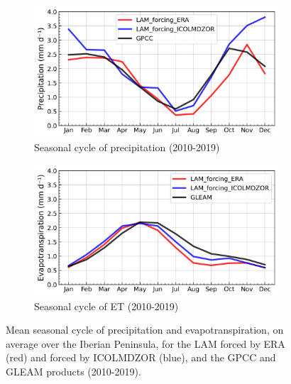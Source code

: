 \begin{figure}[htbp]
    \centering
    \begin{subfigure}[b]{0.49\textwidth}
        \caption{Seasonal cycle of precipitation (2010-2019)}
        \includegraphics[width=\textwidth]{images/chap4/forcing_source/IP_seasonal_cycle_precip.png}
    \end{subfigure}
    \begin{subfigure}[b]{0.49\textwidth}
        \caption{Seasonal cycle of ET (2010-2019)}
        \includegraphics[width=\textwidth]{images/chap4/forcing_source/IP_seasonal_cycle_evap.png}
    \end{subfigure}
    \caption{Mean seasonal cycle of precipitation and evapotranspiration, on average over the Iberian Peninsula, for the LAM forced by ERA (red) and forced by ICOLMDZOR (blue), and the GPCC and GLEAM products (2010-2019).}
    \label{fig:forcing_source_SC}
\end{figure}

\clearpage

